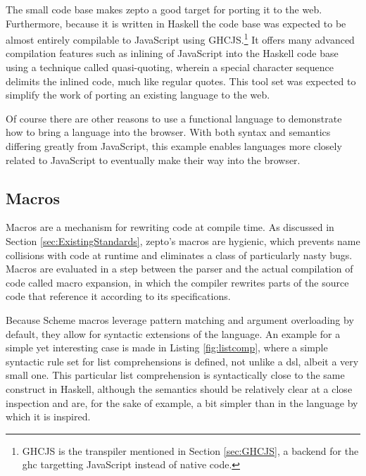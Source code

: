 \documentclass[oneside,11pt,xetex]{scrbook}
\begin{document}
The small code base makes zepto a good target for porting it to the web. Furthermore, because
it is written in Haskell the code base was expected to be almost entirely compilable
to JavaScript using GHCJS.\footnote{GHCJS is the transpiler mentioned in Section \ref{sec:GHCJS},
a backend for the \gls{ghc} targetting JavaScript instead of native code.} It offers many
advanced compilation features such as inlining of JavaScript into the Haskell code
base using a technique called quasi-quoting, wherein a special character sequence delimits the
inlined code, much like regular quotes. This tool set was expected to simplify the work of
porting an existing language to the web.

Of course there are other reasons to use a functional language to demonstrate how to
bring a language into the browser. With both syntax
and semantics differing greatly from JavaScript, this example enables languages more
closely related to JavaScript to eventually make their way into the browser.

\subsection{Macros}
\label{macro}

Macros are a mechanism for rewriting code at compile time. As discussed in
Section \ref{sec:ExistingStandards}, zepto's macros are hygienic, which prevents name collisions
with code at runtime and eliminates a class of particularly nasty bugs. Macros are
evaluated in a step between the parser and the actual compilation of code
called macro expansion, in which the compiler rewrites parts of the source code that reference
it according to its specifications.

Because Scheme macros leverage pattern matching and argument overloading by default,
they allow for syntactic extensions of the language. An example for a simple yet
interesting case is made in Listing \ref{fig:listcomp}, where a simple syntactic rule set
for list comprehensions is defined, not unlike a \gls{dsl}, albeit a very small one.
This particular list comprehension is syntactically close to the same construct in
Haskell, although the semantics should be relatively clear at a close inspection and
are, for the sake of example, a bit simpler than in the language by which it is inspired.
\end{document}
